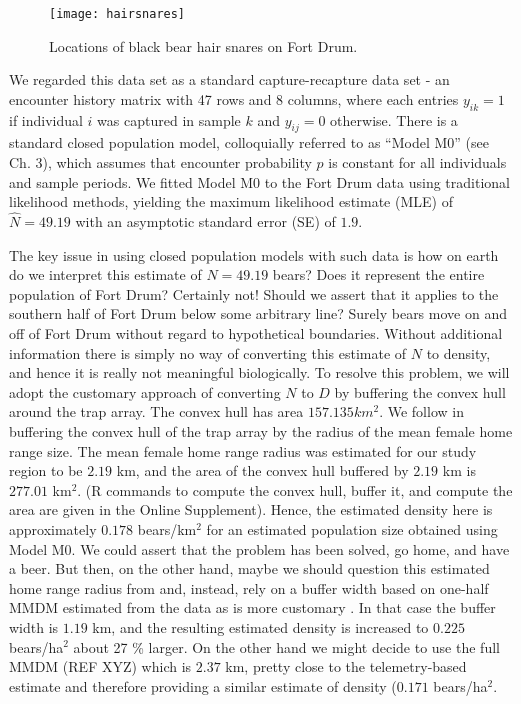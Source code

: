 \begin{figure}
\begin{center}
\texttt{[image: hairsnares]}
\end{center}
\caption{Locations of black bear hair snares on Fort Drum.}
\label{fig.hairsnares}
\end{figure}

We regarded this data set as a standard capture-recapture data set -
an encounter history matrix with 47 rows and 8 columns, where each
entries $y_{ik}=1$ if individual $i$ was captured in sample $k$ and
$y_{ij}=0$ otherwise. There is a standard closed population model,
colloquially referred to as ``Model M0'' (see Ch. 3), which assumes
that encounter probability $p$ is constant for all individuals and
sample periods.  We fitted Model M0 to the Fort Drum data using
traditional likelihood methods, yielding the maximum likelihood
estimate (MLE) of $\hat{N} = 49.19$ with an asymptotic standard error
(SE) of $1.9$.

The key issue in using closed population models with such data is how
on earth do we interpret this estimate of $N=49.19$ bears? Does it
represent the entire population of Fort Drum? Certainly not! Should we
assert that it applies to the southern half of Fort Drum below some
arbitrary line? Surely bears move on and off of Fort Drum without
regard to hypothetical boundaries. Without additional information
there is simply no way of converting this estimate of $N$ to density,
and hence it is really not meaningful biologically. To resolve this
problem, we will adopt the customary approach of converting $N$ to $D$
by buffering the convex hull around the trap array. The convex hull
has area $157.135 km^2$. We follow \citet{bales_etal:2005} in
buffering the convex hull of the trap array by the radius of the mean
female home range size. The mean female home range radius was
estimated \citep{wegan:2008} for our study region to be $2.19$ km, and
the area of the convex hull buffered by $2.19$ km is $277.01$ km$^2$. (R
commands to compute the convex hull, buffer it, and compute the area
are given in the Online Supplement).  Hence, the estimated density
here is approximately $0.178$ bears/km$^2$ for an estimated population
size obtained using Model M0.  We could assert that the problem has
been solved, go home, and have a beer.  But then, on the other hand,
maybe we should question this estimated home range radius from
\citep{wegan:2008} and, instead, rely on a buffer width based on
one-half MMDM estimated from the data as is more customary
\citep{dice:1938}. In that case the buffer width is $1.19$ km, and the
resulting estimated density is increased to $0.225$ bears/ha$^2$ about
27 \% larger.  On the other hand we might decide to use the full MMDM
(REF XYZ) which is $2.37$ km, pretty close to the telemetry-based estimate
and therefore providing a similar estimate of density ($0.171$ bears/ha$^2$.

